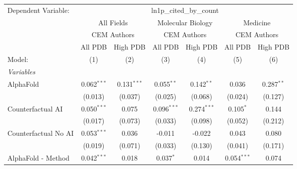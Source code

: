 \begingroup
\centering
\begin{tabular}{lcccccc}
   \tabularnewline \midrule \midrule
   Dependent Variable: & \multicolumn{6}{c}{ln1p\_cited\_by\_count}\\
 & \multicolumn{2}{c}{All Fields} & \multicolumn{2}{c}{Molecular Biology} & \multicolumn{2}{c}{Medicine} \\
\cmidrule(lr){2-3} \cmidrule(lr){4-5} \cmidrule(lr){6-7}
 & \multicolumn{2}{c}{CEM Authors} & \multicolumn{2}{c}{CEM Authors} & \multicolumn{2}{c}{CEM Authors} \\
\cmidrule(lr){2-3} \cmidrule(lr){4-5} \cmidrule(lr){6-7}
 & \multicolumn{1}{c}{All PDB} & \multicolumn{1}{c}{High PDB} & \multicolumn{1}{c}{All PDB} & \multicolumn{1}{c}{High PDB} & \multicolumn{1}{c}{All PDB} & \multicolumn{1}{c}{High PDB} \\
\cmidrule(lr){2-2} \cmidrule(lr){3-3} \cmidrule(lr){4-4} \cmidrule(lr){5-5} \cmidrule(lr){6-6} \cmidrule(lr){7-7}
   Model:                                                     & (1)           & (2)           & (3)           & (4)           & (5)            & (6)\\  
   \midrule
   \emph{Variables}\\
   AlphaFold                                                  & 0.062$^{***}$ & 0.131$^{***}$ & 0.055$^{**}$  & 0.142$^{**}$  & 0.036          & 0.287$^{**}$\\   
                                                              & (0.013)       & (0.037)       & (0.025)       & (0.068)       & (0.024)        & (0.127)\\   
   Counterfactual AI                                          & 0.050$^{***}$ & 0.075         & 0.096$^{***}$ & 0.274$^{***}$ & 0.105$^{*}$    & 0.144\\   
                                                              & (0.017)       & (0.073)       & (0.033)       & (0.098)       & (0.052)        & (0.212)\\   
   Counterfactual No AI                                       & 0.053$^{***}$ & 0.036         & -0.011        & -0.022        & 0.043          & 0.080\\   
                                                              & (0.019)       & (0.071)       & (0.033)       & (0.130)       & (0.041)        & (0.171)\\   
   AlphaFold - Method                                         & 0.042$^{***}$ & 0.018         & 0.037$^{*}$   & 0.014         & 0.054$^{***}$  & 0.074\\   

\end{tabular}
